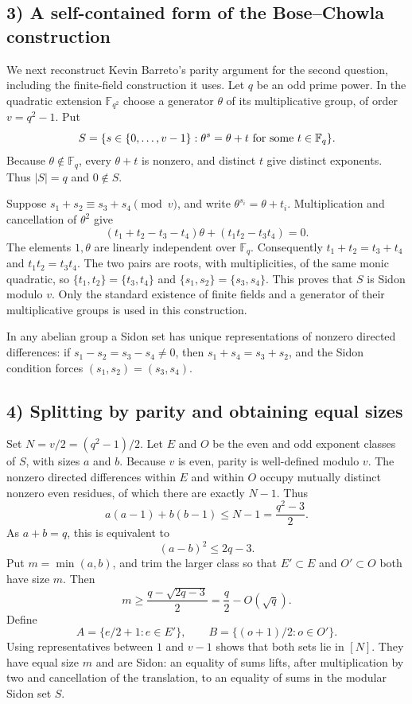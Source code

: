 \subsection{3) A self-contained form of the Bose--Chowla construction}
We next reconstruct Kevin Barreto's parity argument for the second
question, including the finite-field construction it uses.
Let $q$ be an odd prime power. In the quadratic extension
$\mathbb F_{q^2}$ choose a generator $\theta$ of its multiplicative
group, of order $v=q^2-1$. Put
\[
 S=\{s\in\{0,\ldots,v-1\}:\theta^s=\theta+t
       \hbox{ for some }t\in\mathbb F_q\}.
\]
Because $\theta\notin\mathbb F_q$, every $\theta+t$ is nonzero,
and distinct $t$ give distinct exponents. Thus $|S|=q$ and $0\notin S$.

Suppose $s_1+s_2\equiv s_3+s_4\pmod v$, and write
$\theta^{s_i}=\theta+t_i$. Multiplication and cancellation of $\theta^2$
give
\[
 (t_1+t_2-t_3-t_4)\theta+(t_1t_2-t_3t_4)=0.
\]
The elements $1,\theta$ are linearly independent over $\mathbb F_q$.
Consequently $t_1+t_2=t_3+t_4$ and $t_1t_2=t_3t_4$.
The two pairs are roots, with multiplicities, of the same monic quadratic,
so $\{t_1,t_2\}=\{t_3,t_4\}$ and
$\{s_1,s_2\}=\{s_3,s_4\}$. This proves that $S$ is Sidon modulo $v$.
Only the standard existence of finite fields and a generator of their
multiplicative groups is used in this construction.

In any abelian group a Sidon set has unique representations of nonzero
directed differences: if $s_1-s_2=s_3-s_4\neq0$, then
$s_1+s_4=s_3+s_2$, and the Sidon condition forces
$(s_1,s_2)=(s_3,s_4)$.

\subsection{4) Splitting by parity and obtaining equal sizes}
Set $N=v/2=(q^2-1)/2$. Let $E$ and $O$ be the even and odd exponent
classes of $S$, with sizes $a$ and $b$. Because $v$ is even, parity is
well-defined modulo $v$. The nonzero directed differences within $E$
and within $O$ occupy mutually distinct nonzero even residues, of which
there are exactly $N-1$. Thus
\[
 a(a-1)+b(b-1)\leq N-1=\frac{q^2-3}{2}.
\]
As $a+b=q$, this is equivalent to
\[
 (a-b)^2\leq2q-3.
\]
Put $m=\min(a,b)$, and trim the larger class so that
$E'\subset E$ and $O'\subset O$ both have size $m$. Then
\[
 m\geq\frac{q-\sqrt{2q-3}}2=\frac q2-O(\sqrt q).
\]
Define
\[
 A=\{e/2+1:e\in E'\},\qquad
 B=\{(o+1)/2:o\in O'\}.
\]
Using representatives between $1$ and $v-1$ shows that both sets lie in
$[N]$. They have equal size $m$ and are Sidon: an equality of sums lifts,
after multiplication by two and cancellation of the translation, to an
equality of sums in the modular Sidon set $S$.

